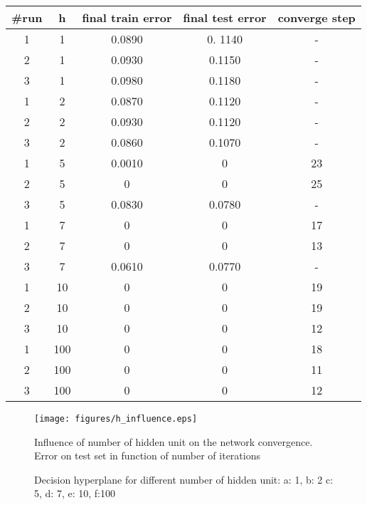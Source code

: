 \documentclass[a4paper,11pt]{exam}
\begin{document}
\begin{center}
\begin{tabular}{ c | c |  c | c | c }
	\#run & h & final train error & final test error & converge step \\
	\hline
	   1 & 1 & 0.0890 & 0. 1140 & - \\  
	   2 & 1 & 0.0930 &  0.1150 & - \\
	   3 & 1 & 0.0980 & 0.1180 & - \\
	   \hline
	   1 & 2 & 0.0870 & 0.1120 & - \\
	   2 & 2 & 0.0930 & 0.1120 & - \\
	   3 & 2 & 0.0860 & 0.1070 & - \\
	   \hline
	   1 & 5 & 0.0010 & 0 & 23 \\
	   2 & 5 & 0 & 0 & 25 \\
	   3 & 5 & 0.0830 & 0.0780 & - \\
	   \hline
	   1 & 7 & 0 & 0 & 17 \\
	   2 & 7 & 0 & 0 &  13 \\
	   3 & 7 & 0.0610 & 0.0770 & - \\
	   \hline
	   1 & 10 & 0 & 0 & 19 \\
	   2 & 10 & 0 & 0 & 19 \\
	   3 & 10 & 0 & 0 & 12 \\
	   \hline
	   1 & 100 & 0 & 0 & 18 \\
	   2 & 100 & 0 & 0 & 11 \\
	   3 & 100 & 0 & 0 & 12 \\
	 \hline
\end{tabular}
\end{center}


\begin{figure}[!h]
\centering
\texttt{[image: figures/h\_influence.eps]}
\caption{Influence of number of hidden unit on the network convergence. Error on test set in function of number of iterations}    
\label{h_influence}
\end{figure}


\begin{figure}[!h]%
    \centering
    \qquad
    \qquad
    \qquad
    \qquad
    \qquad
    \qquad
    \caption{Decision hyperplane for different number of hidden unit: a: 1, b: 2 c: 5, d: 7, e: 10, f:100}%
    \label{h_hyp}%
\end{figure}
\end{document}

